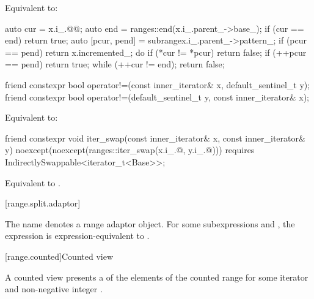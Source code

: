 \begin{itemdescr}
\pnum
\effects Equivalent to:
\begin{codeblock}
auto cur = x.i_.@@;
auto end = ranges::end(x.i_.parent_->base_);
if (cur == end) return true;
auto [pcur, pend] = subrange{x.i_.parent_->pattern_};
if (pcur == pend) return x.incremented_;
do {
  if (*cur != *pcur) return false;
  if (++pcur == pend) return true;
} while (++cur != end);
return false;
\end{codeblock}
\end{itemdescr}

%
\begin{itemdecl}
friend constexpr bool operator!=(const inner_iterator& x, default_sentinel_t y);
friend constexpr bool operator!=(default_sentinel_t y, const inner_iterator& x);
\end{itemdecl}

\begin{itemdescr}
\pnum
\effects Equivalent to: 
\end{itemdescr}

%
\begin{itemdecl}
friend constexpr void iter_swap(const inner_iterator& x, const inner_iterator& y)
  noexcept(noexcept(ranges::iter_swap(x.i_.@, y.i_.@)))
  requires IndirectlySwappable<iterator_t<Base>>;
\end{itemdecl}

\begin{itemdescr}
\pnum
\effects Equivalent to
.
\end{itemdescr}

[range.split.adaptor]{}

\pnum
The name  denotes a
range adaptor object.
For some subexpressions  and ,
the expression  is expression-equivalent to
.


[range.counted]{Counted view}

\pnum
A counted view presents a  of the elements
of the counted range 
for some iterator  and non-negative integer .


